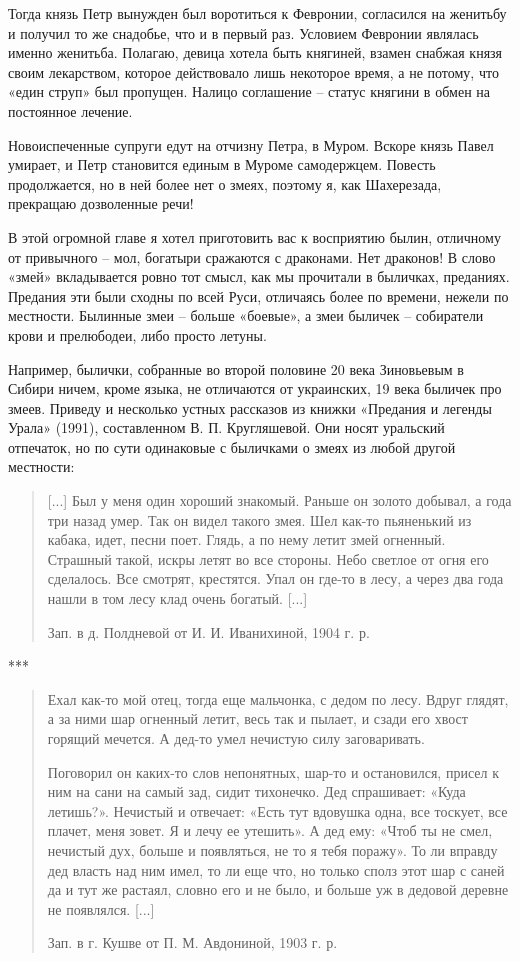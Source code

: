 Тогда князь Петр вынужден был воротиться к Февронии, согласился на женитьбу и получил то же снадобье, что и в первый раз. Условием Февронии являлась именно женитьба. Полагаю, девица хотела быть княгиней, взамен снабжая князя своим лекарством, которое действовало лишь некоторое время, а не потому, что «един струп» был пропущен. Налицо соглашение – статус княгини в обмен на постоянное лечение.

Новоиспеченные супруги едут на отчизну Петра, в Муром. Вскоре князь Павел умирает, и Петр становится единым в Муроме самодержцем. Повесть продолжается, но в ней более нет о змеях, поэтому я, как Шахерезада, прекращаю дозволенные речи!

В этой огромной главе я хотел приготовить вас к восприятию былин, отличному от привычного – мол, богатыри сражаются с драконами. Нет драконов! В слово «змей» вкладывается ровно тот смысл, как мы прочитали в быличках, преданиях. Предания эти были сходны по всей Руси, отличаясь более по времени, нежели по местности. Былинные змеи – больше «боевые», а змеи быличек – собиратели крови и прелюбодеи, либо просто летуны.

Например, былички, собранные во второй половине 20 века Зиновьевым в Сибири\cite{zinoviev01} ничем, кроме языка, не отличаются от украинских, 19 века быличек про змеев. Приведу и несколько устных рассказов из книжки «Предания и легенды Урала» (1991), составленном В. П. Кругляшевой. Они носят уральский отпечаток, но по сути одинаковые с быличками о змеях из любой другой местности:

\begin{quotation}
[...] Был у меня один хороший знакомый. Раньше он золото добывал, а года три назад умер. Так он видел такого змея. Шел как-то пьяненький из кабака, идет, песни поет. Глядь, а по нему летит змей огненный. Страшный такой, искры летят во все стороны. Небо светлое от огня его сделалось. Все смотрят, крестятся. Упал он где-то в лесу, а через два года нашли в том лесу клад очень богатый. [...]

Зап. в д. Полдневой от И. И. Иванихиной, 1904 г. р.
\end{quotation}

\begin{center}
***\end{center}

\begin{quotation}
Ехал как-то мой отец, тогда еще мальчонка, с дедом по лесу. Вдруг глядят, а за ними шар огненный летит, весь так и пылает, и сзади его хвост горящий мечется. А дед-то умел нечистую силу заговаривать.

Поговорил он каких-то слов непонятных, шар-то и остановился, присел к ним на сани на самый зад, сидит тихонечко. Дед спрашивает: «Куда летишь?». Нечистый и отвечает: «Есть тут вдовушка одна, все тоскует, все плачет, меня зовет. Я и лечу ее утешить». А дед ему: «Чтоб ты не смел, нечистый дух, больше и появляться, не то я тебя поражу». То ли вправду дед власть над ним имел, то ли еще что, но только сполз этот шар с саней да и тут же растаял, словно его и не было, и больше уж в дедовой деревне не появлялся. [...]

Зап. в г. Кушве от П. М. Авдониной, 1903 г. р.
\end{quotation}

